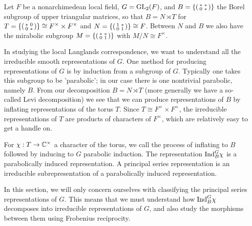 

Let $F$ be a nonarchimedean local field, $G=\mathrm{GL}_2(F)$, and $B=\{\begin{psmallmatrix} *&*\\0&*\end{psmallmatrix}\}$ the Borel subgroup of upper triangular matrices, so that $B=N \rtimes T$ for $T=\{\begin{psmallmatrix}
    *&0\\0&*
\end{psmallmatrix}\} \cong F^\times \times F^\times$ and $N=\{\begin{psmallmatrix}
    1&*\\0&1
\end{psmallmatrix}\}\cong F$. Between $N$ and $B$ we also have the mirabolic subgroup $M=\{\begin{psmallmatrix}
    *&*\\0&1
\end{psmallmatrix}\}$ with $M/N \cong F^\times$.

In studying the local Langlands correspondence, we want to understand all the irreducible smooth representations of $G$. One method for producing representations of $G$ is by induction from a subgroup of $G$. Typically one takes this subgroup to be 'parabolic'; in our case there is one nontrivial parabolic, namely $B$. From our decomposition $B=N \rtimes T$ (more generally we have a so-called Levi decomposition) we see that we can produce representations of $B$ by inflating representations of the torus $T$. Since $T \cong F^\times \times F^\times$, the irreducible representations of $T$ are products of characters of $F^\times$, which are relatively easy to get a handle on.

\begin{defn}
    For $\chi:T \to \mathbb{C}^\times$ a character of the torus, we call the process of inflating to $B$ followed by inducing to $G$ parabolic induction. The representation $\mathrm{Ind}_B^G \chi$ is a parabolically induced representation. A principal series representation is an irreducible subrepresentation of a parabolically induced representation.
\end{defn}

In this section, we will only concern ourselves with classifying the principal series representations of $G$. This means that we must understand how $\mathrm{Ind}_B^G \chi$ decomposes into irreducible representations of $G$, and also study the morphisms between them using Frobenius reciprocity.

